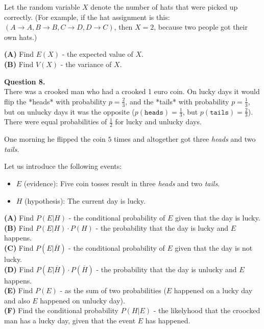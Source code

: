 \documentclass[jou]{apa6}
\begin{document}
Let the random variable $X$ denote the number of hats that
were picked up correctly. (For example, if
the hat assignment is this: $(A \rightarrow A, 
B \rightarrow B, C \rightarrow D, D \rightarrow C)$, then 
$X = 2$, because two people got their own hats.)

{\bf (A)}  Find $E(X)$ - the expected value of $X$.\\
{\bf (B)}  Find $V(X)$ - the variance of $X$. 



\vspace{10pt}
{\bf Question 8.}\\
There was a crooked man who had a crooked 1 euro coin. 
On lucky days it would flip the *heads* with probability $p=\frac{2}{3}$, 
and the *tails* with probability $p=\frac{1}{3}$, but on unlucky days
it was the opposite ($p(\mathtt{heads})=\frac{1}{3}$, but
$p(\mathtt{tails})=\frac{2}{3}$). 
There were equal probabilities of $\frac{1}{2}$ for lucky and unlucky days.


One morning he flipped the coin $5$ times and altogether got three {\em heads}
and two {\em tails}.

Let us introduce the following events:

\begin{itemize}
\item $E$ (evidence): Five coin tosses result in three {\em heads} and two {\em tails}.
\item $H$ (hypothesis): The current day is lucky.
\end{itemize}

{\bf (A)} Find $P(E|H)$ - the conditional probability of $E$ given that the 
day is lucky.\\
{\bf (B)} Find $P(E|H)\cdot P(H)$ - the probability that the day 
is lucky and $E$ happens.\\
{\bf (C)} Find $P(E|\overline{H})$ - the conditional probability of $E$
given that the day is not lucky.\\
{\bf (D)} Find $P(E|\overline{H})\cdot P(\overline{H})$ - the probability 
that the day is unlucky and $E$ happens.\\
{\bf (E)} Find $P(E)$ - as the sum of two probabilities ($E$ happened
on a lucky day and also $E$ happened on unlucky day).\\
{\bf (F)} Find the conditional probability $P(H|E)$ - 
the likelyhood that the croocked man has a lucky day, given 
that the event $E$ has happened.
\end{document}
